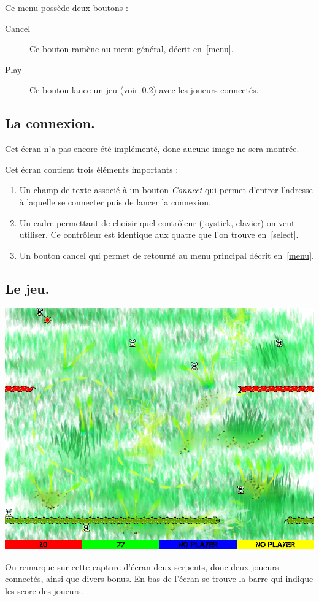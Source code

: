\documentclass{article}
\begin{document}
Ce menu possède deux boutons :
\begin{description}
	\item[Cancel] Ce bouton ramène au menu général, décrit en~\ref{menu}.
	\item[Play] Ce bouton lance un jeu (voir~\ref{game}) avec les joueurs connectés.
\end{description}

\subsection{La connexion.} \label{connect}
Cet écran n'a pas encore été implémenté, donc aucune image ne sera montrée.

Cet écran contient trois éléments importants : \begin{enumerate}
	\item Un champ de texte associé à un bouton \emph{Connect} qui permet d'entrer l'adresse à laquelle se connecter puis de lancer la connexion.
	\item Un cadre permettant de choisir quel contrôleur (joystick, clavier) on veut utiliser. Ce contrôleur est identique aux quatre que l'on trouve en~\ref{select}.
	\item Un bouton cancel qui permet de retourné au menu principal décrit en~\ref{menu}.
\end{enumerate}

\subsection{Le jeu.} \label{game}
\begin{center}
	\includegraphics[scale=0.4]{img/game.png}
\end{center}
On remarque sur cette capture d'écran deux serpents, donc deux joueurs connectés, ainsi que divers bonus. En bas de l'écran se trouve la barre qui indique les score des joueurs.
\end{document}
